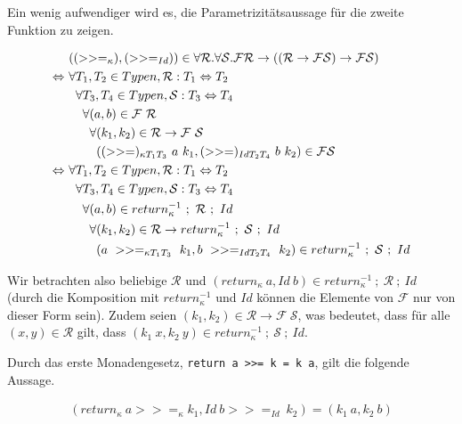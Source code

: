 Ein wenig aufwendiger wird es, die Parametrizitätsaussage für die zweite Funktion zu zeigen.

\begin{align*}
& ((>>=_{\kappa}), (>>=_{Id})) \in \forall \mathcal{R}. \forall \mathcal{S}. \mathcal{F} \mathcal{R} \rightarrow
((\mathcal{R} \rightarrow \mathcal{F} \mathcal{S}) \rightarrow \mathcal{F} \mathcal{S}) \\
\Leftrightarrow ~& \forall T_1, T_2 \in Typen, \mathcal{R} : T_1 \Leftrightarrow T_2 \\
& \hphantom{\forall} \forall T_3, T_4 \in Typen, \mathcal{S} : T_3 \Leftrightarrow T_4 \\
& \hphantom{\forall \forall} \forall (a, b) \in \mathcal{F}\ \mathcal{R} \\
& \hphantom{\forall \forall \forall} \forall (k_1, k_2) \in \mathcal{R} \rightarrow \mathcal{F}\ \mathcal{S}\\
& \hphantom{\forall \forall \forall \forall} ((>>=)_{\kappa T_1 T_3}\ a\ k_1, (>>=)_{Id T_2 T_4}\ b\ k_2) \in \mathcal{F} \mathcal{S}\\
\Leftrightarrow ~& \forall T_1, T_2 \in Typen, \mathcal{R} : T_1 \Leftrightarrow T_2 \\
& \hphantom{\forall} \forall T_3, T_4 \in Typen, \mathcal{S} : T_3 \Leftrightarrow T_4 \\
& \hphantom{\forall \forall} \forall (a, b) \in return_{\kappa}^{-1}~;~\mathcal{R}~;~Id \\
& \hphantom{\forall \forall \forall} \forall (k_1, k_2) \in \mathcal{R} \rightarrow return_{\kappa}^{-1}~;~\mathcal{S}~;~Id\\
& \hphantom{\forall \forall \forall \forall} (a\ >>=_{\kappa T_1 T_3}\ k_1, b\ >>=_{Id T_2 T_4}\ k_2) \in return_{\kappa}^{-1}~;~\mathcal{S}~;~Id
\end{align*}

Wir betrachten also beliebige $\mathcal{R}$ und $(return_{\kappa}\ a, Id\ b) \in return_{\kappa}^{-1}~;~\mathcal{R}~;~Id$
(durch die Komposition mit $return_{\kappa}^{-1}$ und $Id$ können die Elemente von $\mathcal{F}$ nur von dieser Form sein).
Zudem seien $(k_1, k_2) \in \mathcal{R} \rightarrow \mathcal{F}\ \mathcal{S}$, was bedeutet, dass für alle $(x, y) \in \mathcal{R}$
gilt, dass $(k_1\ x, k_2\ y) \in return_{\kappa}^{-1}~;~\mathcal{S}~;~Id$.

Durch das erste Monadengesetz, \texttt{return a >>= k = k a}, gilt die folgende Aussage.

\begin{align*}
(return_{\kappa}\ a >>=_{\kappa} k_1, Id\ b >>=_{Id}\ k_2) = (k_1\ a, k_2\ b)
\end{align*}

